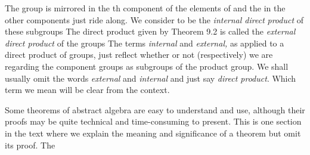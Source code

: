 \documentclass[11pt,oneside]{article}
\begin{document}
\begin{BookBody}
\noindent The group  is mirrored in the th component of the elements of  and the  in the other components just ride along. We consider  to be the\textit{ internal direct} \textit{product} of these subgroups  The direct product given by Theorem 9.2 is called the \textit{external direct product} of the groups  The terms\textit{ internal} and\textit{ external,} as applied to a direct product of groups, just reflect whether or not (respectively) we are regarding the component groups as subgroups of the product group. We shall usually omit the words \textit{external} and\textit{ internal} and just say\textit{ direct product}. Which term we mean will be clear from the context.


\noindent Some theorems of abstract algebra are easy to understand and use, although their proofs may be quite technical and time-consuming to present. This is one section in the text where we explain the meaning and significance of a theorem but omit its proof. The

\end{BookBody}

\BookNarrativetrue
\end{document}
